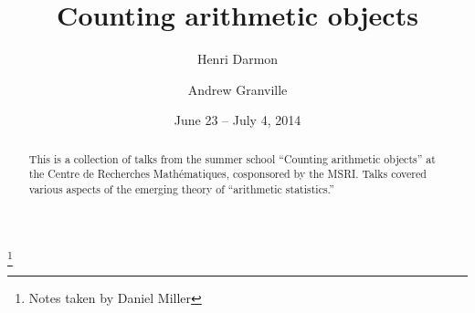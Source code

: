 \documentclass[english,letterpaper]{smfart}
\author{Henri Darmon}
\author{Andrew Granville}
\title{Counting arithmetic objects}
\date{June 23 -- July 4, 2014}
\begin{document}
\frontmatter

\begin{abstract}
This is a collection of talks from the summer school ``Counting arithmetic 
objects'' at the Centre de Recherches Math\'ematiques, cosponsored by the 
MSRI. Talks covered various aspects of the emerging theory of ``arithmetic 
statistics.'' 
\end{abstract}

\thanks{Notes taken by Daniel Miller}

\maketitle
\tableofcontents
\mainmatter











\backmatter


\end{document}
